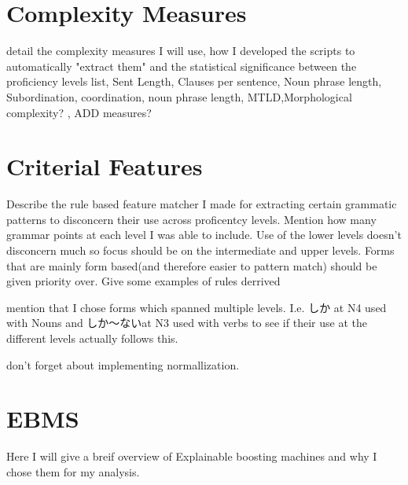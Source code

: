 \section{Complexity Measures}
detail the complexity measures I will use, how I developed the scripts to automatically "extract them" and the statistical significance between the proficiency levels
list, Sent Length, Clauses per sentence, Noun phrase length,  Subordination, coordination, noun phrase length, MTLD,Morphological complexity? , ADD measures?

\section{Criterial Features}
Describe the rule based feature matcher I made for extracting certain grammatic patterns to disconcern their use
across proficentcy levels. Mention how many grammar points at each level I was able to include. Use of the lower
levels doesn't disconcern much so focus should be on the intermediate and upper levels.  Forms that are mainly form
based(and therefore easier to pattern match) should be given priority over. Give some examples of rules derrived

mention that I chose forms which spanned multiple levels. I.e. しか at N4 used with Nouns and しか〜ないat N3 used
with verbs to see if their use at the different levels actually follows this.

don't forget about implementing normallization.

\section{EBMS}
 Here I will give a breif overview of Explainable boosting machines and why I chose them for my analysis.






